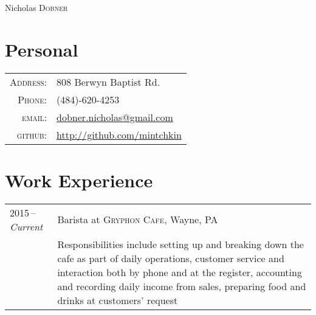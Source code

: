 \documentclass[a4paper,10pt]{article}
\begin{document}
\pagestyle{empty} %

\newfontfamily{} %

\par{\centering
        {\Huge Nicholas \textsc{Dobner}
    }\bigskip\par}

\section{Personal}
\begin{tabular}{rl}
    \textsc{Address:}   & 808 Berwyn Baptist Rd. \\
    \textsc{Phone:}     & (484)-620-4253 \\
    \textsc{email:}     & \href{mailto:dobner.nicholas@gmail.com}{dobner.nicholas@gmail.com} \\
    \textsc{github:}    & \href{https://github.com/mintchkin}{http://github.com/mintchkin}
\end{tabular}

\section{Work Experience}
\begin{tabularx}{\textwidth}{@{}p{6em}|X@{}}
    2015\,--\,\emph{Current}& Barista at \textsc{Gryphon Cafe}, Wayne, PA \\
    & \footnotesize{Responsibilities include setting up and breaking down the cafe as part of daily operations, customer service and interaction both by phone and at the register, accounting and recording daily income from sales, preparing food and drinks at customers' request} \\
\end{tabularx}
\end{document}
